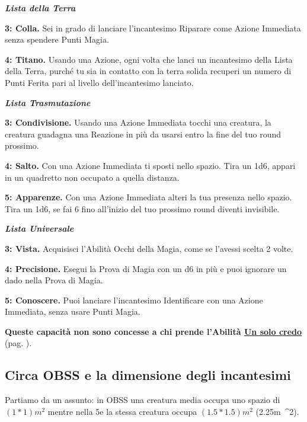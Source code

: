 \begin{multicols}{2}
\emph{\textbf{Lista della Terra}}

\textbf{3: Colla.} Sei in grado di lanciare l'incantesimo Riparare come Azione Immediata senza spendere Punti Magia.

\textbf{4: Titano.} Usando una Azione, ogni volta che lanci un incantesimo della Lista della Terra, purché tu sia in contatto con la terra solida recuperi un numero di Punti Ferita pari al livello dell'incantesimo lanciato.

\emph{\textbf{Lista Trasmutazione}}

\textbf{3: Condivisione.} Usando una Azione Immediata tocchi una creatura, la creatura guadagna una Reazione in più da usarsi entro la fine del tuo round prossimo.

\textbf{4: Salto.} Con una Azione Immediata ti sposti nello spazio. Tira un 1d6, appari in un quadretto non occupato a quella distanza.

\textbf{5: Apparenze.} Con una Azione Immediata alteri la tua presenza nello spazio. Tira un 1d6, se fai 6 fino all'inizio del tuo prossimo round diventi invisibile.

\emph{\textbf{Lista Universale}}

\textbf{3: Vista.} Acquisisci l'Abilità Occhi della Magia, come se l'avessi scelta 2 volte.

\textbf{4: Precisione.} Esegui la Prova di Magia con un d6 in più e puoi ignorare un dado nella Prova di Magia.

\textbf{5: Conoscere.} Puoi lanciare l'incantesimo Identificare con una Azione Immediata, senza usare Punti Magia.

\textbf{Queste capacità non sono concesse a chi prende l'Abilità \hyperlink{Un solo credo}{Un solo credo}} (pag. \pageref{Un solo credo}).





\subsection*{Circa OBSS e la dimensione degli incantesimi}

Partiamo da un assunto: in OBSS una creatura media occupa uno spazio di $(1*1)\si{m^{2}}$ mentre nella 5e la stessa creatura occupa $(1.5*1.5)\si{m{^2}}$ (2.25\si{m{^2}}).


\end{multicols}
